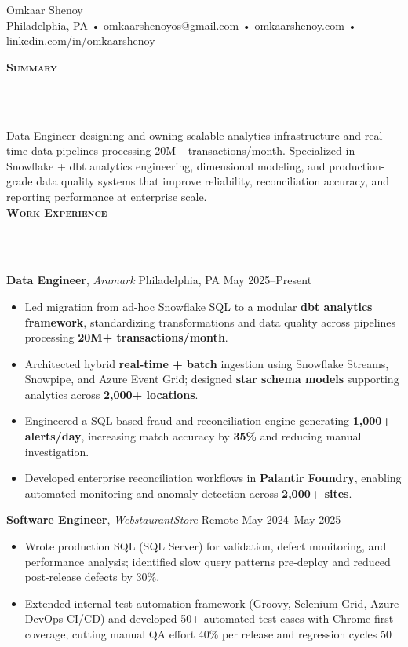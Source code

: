 \documentclass[10pt]{article}
\newcommand{\lineunder} {
    \vspace*{-10pt} \\
    \hspace*{-18pt} \hrulefill \\
    \vspace*{2pt}
}
\newcommand{\header} [1] {
  \vspace*{2pt}
    {\hspace*{-15pt}\textsc{#1}}
    \lineunder
}
\begin{document}
\begin{center}
  {\Huge Omkaar Shenoy} \\
  Philadelphia, PA \;•\;
  \href{mailto:omkaarshenoyos@gmail.com}{omkaarshenoyos@gmail.com} \;•\;
  \href{https://omkaarshenoy.com}{omkaarshenoy.com} \;•\;
  \href{https://www.linkedin.com/in/omkaarshenoy}{linkedin.com/in/omkaarshenoy}
\end{center}

\header{\textbf{Summary}}
Data Engineer designing and owning scalable analytics infrastructure and real-time data pipelines processing 20M+ transactions/month. Specialized in Snowflake + dbt analytics engineering, dimensional modeling, and production-grade data quality systems that improve reliability, reconciliation accuracy, and reporting performance at enterprise scale.\\
\header{\textbf{Work Experience}}

\textbf{Data Engineer}, \textit{Aramark} \hfill Philadelphia, PA \textbar{} May 2025--Present\\
\begin{itemize}[leftmargin=5mm, itemsep=0mm]
  \item Led migration from ad-hoc Snowflake SQL to a modular \textbf{dbt analytics framework}, standardizing transformations and data quality across pipelines processing \textbf{20M+ transactions/month}.
  \item Architected hybrid \textbf{real-time + batch} ingestion using Snowflake Streams, Snowpipe, and Azure Event Grid; designed \textbf{star schema models} supporting analytics across \textbf{2,000+ locations}.
  \item Engineered a SQL-based fraud and reconciliation engine generating \textbf{1,000+ alerts/day}, increasing match accuracy by \textbf{35\%} and reducing manual investigation.
  \item Developed enterprise reconciliation workflows in \textbf{Palantir Foundry}, enabling automated monitoring and anomaly detection across \textbf{2,000+ sites}.
\end{itemize}


\textbf{Software Engineer}, \textit{WebstaurantStore} \hfill Remote \textbar{} May 2024--May 2025\\
\begin{itemize}[leftmargin=5mm, itemsep=0mm]
  \item Wrote production SQL (SQL Server) for validation, defect monitoring, and performance analysis; identified slow query patterns pre-deploy and reduced post-release defects by 30\%.
  \item Extended internal test automation framework (Groovy, Selenium Grid, Azure DevOps CI/CD) and developed 50+ automated test cases with Chrome-first coverage, cutting manual QA effort 40\% per release and regression cycles 50%
\end{itemize}
\end{document}
